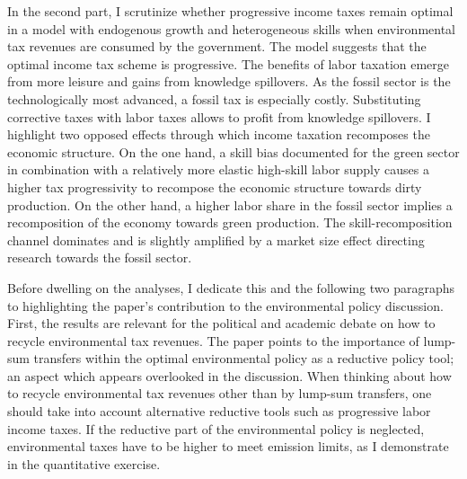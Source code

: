 In the second part, I scrutinize whether progressive income taxes remain optimal in a model with endogenous growth and heterogeneous skills when environmental tax revenues are consumed by the government.
 The model suggests that the optimal income tax scheme is progressive. The benefits of labor taxation emerge from more leisure and gains from knowledge spillovers. As the fossil sector is  the technologically most advanced, a fossil tax is especially costly. Substituting corrective taxes with labor taxes allows to profit from knowledge spillovers. I highlight two opposed effects through which income taxation recomposes the economic structure. On the one hand, a skill bias documented for the green sector \citep{Consoli2016DoCapital} in combination with a relatively more elastic high-skill labor supply causes a higher tax progressivity to recompose the economic structure towards dirty production. On the other hand, a higher labor share in the fossil sector implies a recomposition of the economy towards green production.
  The skill-recomposition channel dominates and is slightly amplified by a market size effect directing research towards the fossil sector. 
 
 

Before dwelling on the analyses, I dedicate this and the following two paragraphs to highlighting the paper's contribution to the environmental policy discussion. 
First, the results are relevant for the political and academic debate on how  to recycle environmental tax revenues. The paper points to the importance of lump-sum transfers within the optimal environmental policy as a reductive policy tool; an aspect which appears overlooked in the discussion.%
When thinking about how to recycle environmental tax revenues other than by lump-sum transfers,  one should take into account alternative reductive tools such as progressive labor income taxes. 
If the reductive part of the environmental policy is neglected, environmental taxes have to be higher to meet emission limits, as I demonstrate in the quantitative exercise.

